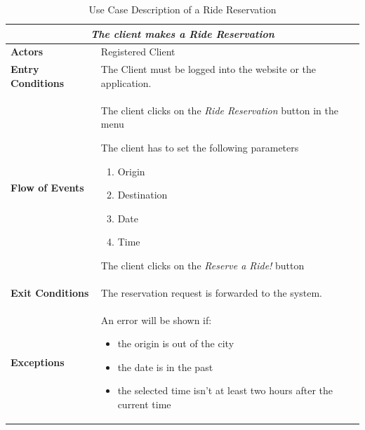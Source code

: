 \documentclass[a4paper]{article}
\begin{document}
\begin{enumerate}[label=\bfseries G\arabic*:]
\begin{table} [H]
\begin{center}
\begin{tabular}{ |m{}|m{}|  }
\hline
    \multicolumn{2}{|c|}{\textbf{\textit{The client makes a Ride Reservation }}} \\
\hline \hline
    \textbf{Actors}
&   Registered Client
\\ \hline
    \textbf{Entry Conditions}
&   The Client must be logged into the website or the application.
\\ \hline
    \textbf{Flow of Events}
& 
    \begin{enumerate*}
    \item The client clicks on the \emph{Ride Reservation} button in the menu
    \item The client has to set the following parameters
        \begin{enumerate}
        \item Origin
        \item Destination
        \item Date
        \item Time
        \end{enumerate}
    \item The client clicks on the \emph{Reserve a Ride!} button
    \end{enumerate*}
\\ \hline
    \textbf{Exit Conditions}
&   The reservation request is forwarded to the system.
\\ \hline
    \textbf{Exceptions}
&   An error will be shown if:
    \begin{itemize}
    \item the origin is out of the city
    \item the date is in the past
    \item the selected time isn't at least two hours after the current time
    \end{itemize}
\\ \hline
\end{tabular}
\end{center}
\caption{Use Case Description of a Ride Reservation}
\label{table:clientridereservation}
\end{table}



\end{enumerate}
\end{document}
